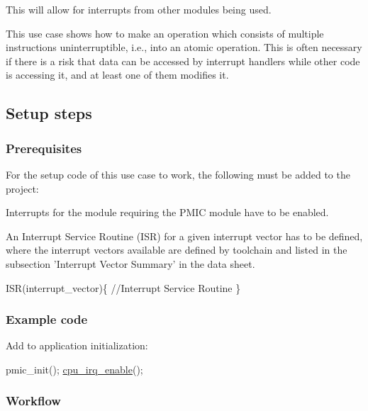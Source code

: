 This will allow for interrupts from other modules being used.

This use case shows how to make an operation which consists of multiple instructions uninterruptible, i.\-e., into an atomic operation. This is often necessary if there is a risk that data can be accessed by interrupt handlers while other code is accessing it, and at least one of them modifies it.\hypertarget{pmic_use_case_1_pmic_use_case_1_setup}{}\subsection{Setup steps}\label{pmic_use_case_1_pmic_use_case_1_setup}
\hypertarget{pmic_use_case_1_pmic_basic_use_case_setup_prereq}{}\subsubsection{Prerequisites}\label{pmic_use_case_1_pmic_basic_use_case_setup_prereq}
For the setup code of this use case to work, the following must be added to the project\-:
\begin{DoxyEnumerate}
\item Interrupts for the module requiring the P\-M\-I\-C module have to be enabled.
\item An Interrupt Service Routine (I\-S\-R) for a given interrupt vector has to be defined, where the interrupt vectors available are defined by toolchain and listed in the subsection 'Interrupt Vector Summary' in the data sheet. 
\begin{DoxyCode}
        ISR(interrupt\_vector)\{
            \textcolor{comment}{//Interrupt Service Routine}
        \}
\end{DoxyCode}

\end{DoxyEnumerate}\hypertarget{pmic_use_case_1_pmic_use_case_1_setup_code}{}\subsubsection{Example code}\label{pmic_use_case_1_pmic_use_case_1_setup_code}
Add to application initialization\-: 
\begin{DoxyCode}
        pmic\_init();
        \hyperlink{group__interrupt__group_gae4922a4bd8ba4150211fbc7f2302403c}{cpu\_irq\_enable}();
\end{DoxyCode}
\hypertarget{pmic_use_case_1_pmic_use_case_1_setup_flow}{}\subsubsection{Workflow}\label{pmic_use_case_1_pmic_use_case_1_setup_flow}

